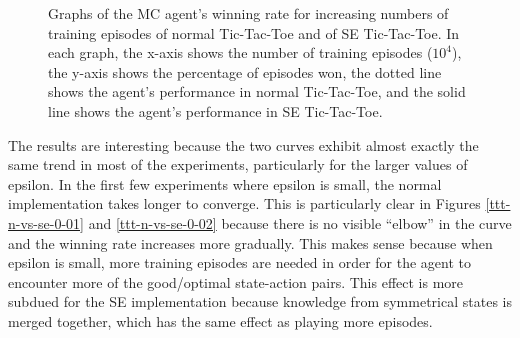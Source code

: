 \documentclass[11pt,a4paper]{report}
\begin{document}
\begin{figure}

    \caption{Graphs of the MC agent's winning rate for increasing numbers of training episodes of normal Tic-Tac-Toe and of SE Tic-Tac-Toe. In each graph, the x-axis shows the number of training episodes ($10^4$), the y-axis shows the percentage of episodes won, the dotted line shows the agent's performance in normal Tic-Tac-Toe, and the solid line shows the agent's performance in SE Tic-Tac-Toe.}
    \label{fig:tictactoe-normal-vs-symmetric-equality-performance}
\end{figure}

The results are interesting because the two curves exhibit almost exactly the same trend in most of the experiments, particularly for the larger values of epsilon. In the first few experiments where epsilon is small, the normal implementation takes longer to converge. This is particularly clear in Figures \ref{ttt-n-vs-se-0-01} and \ref{ttt-n-vs-se-0-02} because there is no visible ``elbow'' in the curve and the winning rate increases more gradually. This makes sense because when epsilon is small, more training episodes are needed in order for the agent to encounter more of the good/optimal state-action pairs. This effect is more subdued for the SE implementation because knowledge from symmetrical states is merged together, which has the same effect as playing more episodes.
\end{document}
